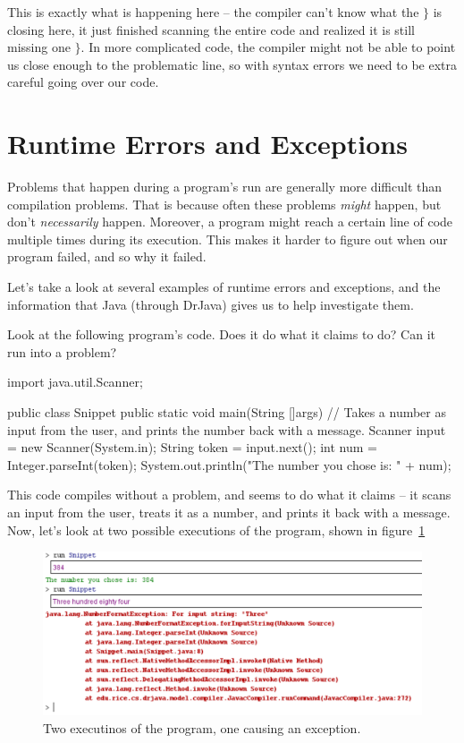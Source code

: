 This is exactly what is happening here -- the compiler can't know what the $\}$ is closing here, it just finished scanning the entire code and realized it is still missing one $\}$. In more complicated code, the compiler might not be able to point us close enough to the problematic line, so with syntax errors we need to be extra careful going over our code.

\section{Runtime Errors and Exceptions}

Problems that happen during a program's run are generally more difficult than compilation problems. That is because often these problems \emph{might} happen, but don't \emph{necessarily} happen. Moreover, a program might reach a certain line of code multiple times during its execution. This makes it harder to figure out when our program failed, and so why it failed.

Let's take a look at several examples of runtime errors and exceptions, and the information that Java (through DrJava) gives us to help investigate them.

\begin{example}
Look at the following program's code. Does it do what it claims to do? Can it run into a problem?

\begin{code}
import java.util.Scanner;

public class Snippet{
    public static void main(String []args){
      // Takes a number as input from the user, and prints the number back with a message.
      Scanner input = new Scanner(System.in);
      String token = input.next();
      int num = Integer.parseInt(token);
      System.out.println("The number you chose is: " + num);
    }
}
\end{code}
\end{example}

This code compiles without a problem, and seems to do what it claims -- it scans an input from the user, treats it as a number, and prints it back with a message. Now, let's look at two possible executions of the program, shown in figure~\ref{fig:number_format_error}

\begin{figure}[h!]
\centering
\includegraphics[scale=0.7]{lectures/images/number_format_exception.PNG}
\caption{Two executinos of the program, one causing an exception.}
\label{fig:number_format_error}
\end{figure}


